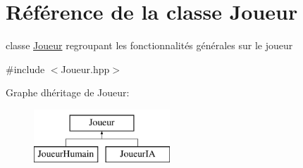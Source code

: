 \hypertarget{class_joueur}{}\section{Référence de la classe Joueur}
\label{class_joueur}


classe \hyperlink{class_joueur}{Joueur} regroupant les fonctionnalités générales sur le joueur  




{\ttfamily \#include $<$Joueur.\+hpp$>$}

Graphe d\textquotesingle{}héritage de Joueur\+:\begin{figure}[H]
\begin{center}
\leavevmode
\includegraphics[height=2.000000cm]{class_joueur}
\end{center}
\end{figure}
